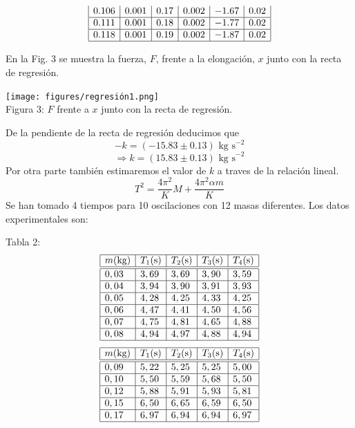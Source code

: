 \documentclass{article}
\begin{document}
\begin{multicols}{2}
\begin{center}
$$\begin{array}{|l|l|l|l|l|l|}
  0.106 & 0.001 & 0.17 & 0.002 & -1.67 & 0.02  \\ \hline
  0.111 & 0.001 & 0.18 & 0.002 & -1.77 & 0.02  \\ \hline
  0.118 & 0.001 & 0.19 & 0.002 & -1.87 & 0.02  \\ \hline
  \end{array}
$$
\end{center}
En la Fig. 3 se muestra la fuerza, $F$, frente a la elongación, $x$ junto con la recta de regresión.
\begin{center}
  \texttt{[image: figures/regresión1.png]}\\
  Figura 3: $F$ frente a $x$ junto con la recta de regresión.
\end{center}
De la pendiente de la recta de regresión deducimos que
$$
-k = (-15.83 \pm 0.13 ) \text{ kg s}^{-2}
$$
$$
\Rightarrow k = (15.83 \pm 0.13 ) \text{ kg s}^{-2}
$$
Por otra parte también estimaremos el valor de $k$ a traves de la relación lineal.
$$
T^2 = \frac{4\pi^2}{K} M + \frac{4\pi^2\alpha m}{K}
$$
Se han tomado 4 tiempos para 10 oscilaciones con 12 masas diferentes. Los datos experimentales son:
\begin{center}
Tabla 2:
$$
\begin{array}{|l|l|l|l|l|} \hline
  m\text{(kg)} & T_1\text{(s)} & T_2\text{(s)} & T_3\text{(s)} & T_4\text{(s)} \\ \hline \hline
  0,03 & 3,69 & 3,69 & 3,90 & 3,59  \\ \hline
  0,04 & 3,94 & 3,90 & 3,91 & 3,93  \\ \hline
  0,05 & 4,28 & 4,25 & 4,33 & 4,25  \\ \hline
  0,06 & 4,47 & 4,41 & 4,50 & 4,56  \\ \hline
  0,07 & 4,75 & 4,81 & 4,65 & 4,88  \\ \hline
  0,08 & 4,94 & 4,97 & 4,88 & 4,94  \\ \hline
\end{array}
$$
$$
\begin{array}{|l|l|l|l|l|} \hline
  m\text{(kg)} & T_1\text{(s)} & T_2\text{(s)} & T_3\text{(s)} & T_4\text{(s)} \\ \hline \hline
  0,09 & 5,22 & 5,25 & 5,25 & 5,00  \\ \hline
  0,10 & 5,50 & 5,59 & 5,68 & 5,50  \\ \hline
  0,12 & 5,88 & 5,91 & 5,93 & 5,81  \\ \hline
  0,15 & 6,50 & 6,65 & 6,59 & 6,50  \\ \hline
  0,17 & 6,97 & 6,94 & 6,94 & 6,97  \\ \hline

\end{array}$$
\end{center}
\end{multicols}
\end{document}
